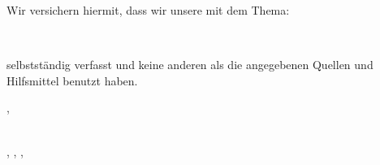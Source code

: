 Wir versichern hiermit, dass wir unsere \dhbwGetTextType{} mit dem Thema:

\begin{center}
    \textbf{%
        {\large \dhbwGetTitle{}}\\
        \ifdef{\dhbwGetSubtitle{}}{%
            \dhbwGetSubtitle{}
        }{}
    }
\end{center}

selbstständig verfasst und keine anderen als die angegebenen Quellen und Hilfsmittel benutzt haben.

\vspace{1cm}
\dhbwGetLocation{},\ \dhbwGetDate{}

\vspace{.5cm}

\dotfill \\
\authorA, \authorB, \authorC, \authorD
